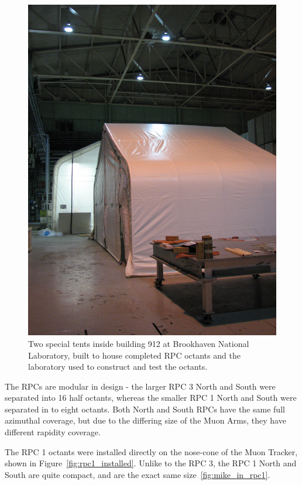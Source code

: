 \begin{figure}
  \centering
  \includegraphics[width=0.5\linewidth]{./figures/building_912_rpc_tent.jpg}
  \caption{
    Two special tents inside building 912 at Brookhaven National Laboratory,
    built to house completed RPC octants and the laboratory used to construct
    and test the octants. 
  }
  \label{fig:building_912}
\end{figure}

The RPCs are modular in design - the larger RPC 3 North and South were separated
into 16 half octants, whereas the smaller RPC 1 North and South were separated
in to eight octants. Both North and South RPCs have the same full azimuthal
coverage, but due to the differing size of the Muon Arms, they have different
rapidity coverage.

The RPC 1 octants were installed directly on the nose-cone of the Muon Tracker,
shown in Figure~\ref{fig:rpc1_installed}. Unlike to the RPC 3, the RPC 1 North
and South are quite compact, and are the exact same size~\ref{fig:mike_in_rpc1}.


